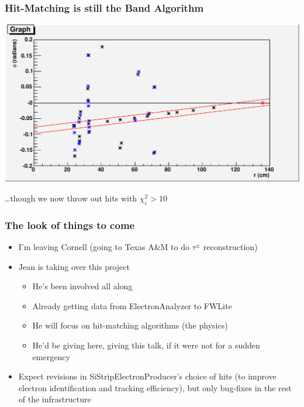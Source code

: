 \documentclass[12pt,compress]{beamer}
\begin{document}
\begin{frame}
\frametitle{Hit-Matching is still the Band Algorithm}

\begin{center}
\includegraphics[width=\linewidth]{event_display_banded}
\end{center}

\vspace{-0.25 cm}
\ldots though we now throw out hits with $\chi^2_i > 10$
\end{frame}

\begin{frame}
\frametitle{The look of things to come}

\begin{itemize}
\item I'm leaving Cornell (going to Texas A\&M to do $\tau^\pm$ reconstruction)
\item Jean is taking over this project
\begin{itemize}
\item He's been involved all along
\item Already getting data from ElectronAnalyzer to FWLite
\item He will focus on hit-matching algorithms (the physics)
\item He'd be giving here, giving this talk, if it were not for a sudden emergency
\end{itemize}
\item Expect revisions in SiStripElectronProducer's choice of hits (to
improve electron identification and tracking efficiency), but only
bug-fixes in the rest of the infrastructure
\end{itemize}
\label{numpages}
\end{frame}
\end{document}
